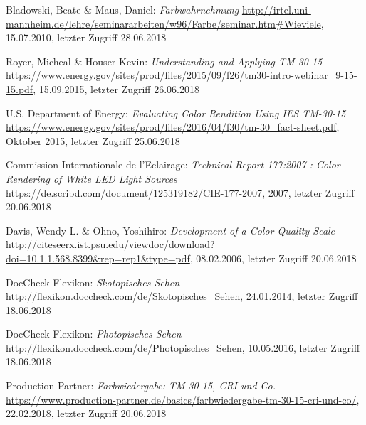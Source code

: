 \begin{thebibliography}{}


Bladowski, Beate \& Maus, Daniel:
\emph{\glqq Farbwahrnehmung\grqq}
\url{http://irtel.uni-mannheim.de/lehre/seminararbeiten/w96/Farbe/seminar.htm#Wieviele}, 15.07.2010, letzter Zugriff 28.06.2018

Royer, Micheal \& Houser Kevin:
\emph{\glqq Understanding and Applying TM-30-15\grqq}
\url{https://www.energy.gov/sites/prod/files/2015/09/f26/tm30-intro-webinar_9-15-15.pdf}, 15.09.2015, letzter Zugriff 26.06.2018

U.S. Department of Energy:
\emph{\glqq Evaluating Color Rendition Using IES TM-30-15\grqq}
\url{https://www.energy.gov/sites/prod/files/2016/04/f30/tm-30_fact-sheet.pdf}, Oktober 2015, letzter Zugriff 25.06.2018

Commission Internationale de l'Eclairage:
\emph{\glqq Technical Report 177:2007 : Color Rendering of White LED Light Sources\grqq}
\url{https://de.scribd.com/document/125319182/CIE-177-2007}, 2007, letzter Zugriff 20.06.2018

Davis, Wendy L. \& Ohno, Yoshihiro:
\emph{\glqq Development of a Color Quality Scale\grqq}
\url{http://citeseerx.ist.psu.edu/viewdoc/download?doi=10.1.1.568.8399&rep=rep1&type=pdf}, 08.02.2006, letzter Zugriff 20.06.2018

DocCheck Flexikon:
\emph{\glqq Skotopisches Sehen\grqq}
\url{http://flexikon.doccheck.com/de/Skotopisches_Sehen}, 24.01.2014, letzter Zugriff 18.06.2018

DocCheck Flexikon:
\emph{\glqq Photopisches Sehen\grqq}
\url{http://flexikon.doccheck.com/de/Photopisches_Sehen}, 10.05.2016, letzter Zugriff 18.06.2018

Production Partner:
\emph{\glqq Farbwiedergabe: TM-30-15, CRI und Co.\grqq}
\url{https://www.production-partner.de/basics/farbwiedergabe-tm-30-15-cri-und-co/}, 22.02.2018, letzter Zugriff 20.06.2018


\end{thebibliography}
